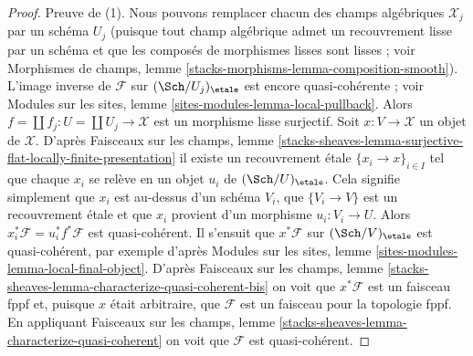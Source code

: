\begin{proof}
Preuve de (1). Nous pouvons remplacer chacun des champs algébriques $\mathcal{X}_j$
par un schéma $U_j$ (puisque tout champ algébrique admet un recouvrement lisse par
un schéma et que les composés de morphismes lisses sont lisses ; voir
Morphismes de champs, lemme \ref{stacks-morphisms-lemma-composition-smooth}).
L'image inverse de $\mathcal{F}$ sur $(\Sch/U_j)_\etale$ est encore
quasi-cohérente ; voir
Modules sur les sites, lemme \ref{sites-modules-lemma-local-pullback}.
Alors $f = \coprod f_j : U = \coprod U_j \to \mathcal{X}$ est un morphisme lisse
surjectif. Soit $x : V \to \mathcal{X}$ un objet de $\mathcal{X}$. D'après
Faisceaux sur les champs, lemme
\ref{stacks-sheaves-lemma-surjective-flat-locally-finite-presentation}
il existe un recouvrement étale $\{x_i \to x\}_{i \in I}$ tel que chaque
$x_i$ se relève en un objet $u_i$ de $(\Sch/U)_\etale$.
Cela signifie simplement que $x_i$ est au-dessus d'un schéma $V_i$, que
$\{V_i \to V\}$ est un recouvrement étale et que $x_i$ provient
d'un morphisme $u_i : V_i \to U$. Alors
$x_i^*\mathcal{F} = u_i^*f^*\mathcal{F}$ est quasi-cohérent.
Il s'ensuit que $x^*\mathcal{F}$ sur $(\Sch/V)_\etale$
est quasi-cohérent, par exemple d'après
Modules sur les sites, lemme \ref{sites-modules-lemma-local-final-object}.
D'après Faisceaux sur les champs, lemme
\ref{stacks-sheaves-lemma-characterize-quasi-coherent-bis}
on voit que $x^*\mathcal{F}$ est un faisceau fppf et, puisque $x$
était arbitraire, que $\mathcal{F}$ est un faisceau pour la
topologie fppf. En appliquant Faisceaux sur les champs, lemme
\ref{stacks-sheaves-lemma-characterize-quasi-coherent}
on voit que $\mathcal{F}$ est quasi-cohérent.


\end{proof}
